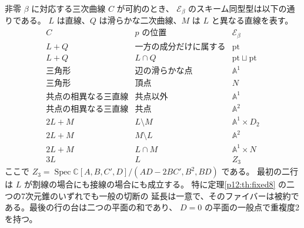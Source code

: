 \begin{theorem}\label{p12:th:extensionfibers}
非零 $\beta$ に対応する三次曲線 $C$ が可約のとき、
$\mathcal E_\beta$ のスキーム同型型は以下の通りである。
$L$ は直線、$Q$ は滑らかな二次曲線、$M$ は $L$ と異なる直線を表す。
\[
\begin{array}{lll}
C & p\text{ の位置} & \mathcal E_\beta\\ \hline
L+Q & \text{一方の成分だけに属する} & \mathrm{pt}\\
L+Q & L\cap Q & \mathrm{pt}\sqcup\mathrm{pt}\\
\text{三角形} & \text{辺の滑らかな点} & \mathbb A^1\\
\text{三角形} & \text{頂点} & N\\
\text{共点の相異なる三直線} & \text{共点以外} & \mathbb A^1\\
\text{共点の相異なる三直線} & \text{共点} & \mathbb A^2\\
2L+M & L\setminus M & \mathbb A^1\times D_2\\
2L+M & M\setminus L & \mathbb A^2\\
2L+M & L\cap M & \mathbb A^1\times N\\
3L & L & Z_3
\end{array}
\]
ここで $Z_3=\operatorname{Spec}\mathbb C[A,B,C',D]/(AD-2BC',B^2,BD)$ である。
最初の二行は $L$ が割線の場合にも接線の場合にも成立する。
特に定理\ref{p12:th:fixed8} の二つの7次元錐のいずれでも一般の切断の
延長は一意で、そのファイバーは被約である。最後の行の台は二つの平面の和であり、
$D=0$ の平面の一般点で重複度2を持つ。
\end{theorem}

